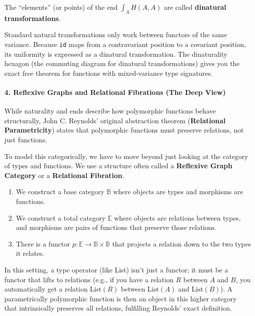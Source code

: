 \documentclass[
]{article}
\providecommand{\tightlist}{%
  \setlength{\itemsep}{0pt}\setlength{\parskip}{0pt}}
\begin{document}
The ``elements'' (or points) of the end \(\int_A H(A, A)\) are called
\textbf{dinatural transformations}.

Standard natural transformations only work between functors of the same
variance. Because \texttt{id} maps from a contravariant position to a
covariant position, its uniformity is expressed as a dinatural
transformation. The dinaturality hexagon (the commuting diagram for
dinatural transformations) gives you the exact free theorem for
functions with mixed-variance type signatures.

\paragraph{4. Reflexive Graphs and Relational Fibrations (The Deep
View)}\label{reflexive-graphs-and-relational-fibrations-the-deep-view}

While naturality and ends describe how polymorphic functions behave
structurally, John C. Reynolds' original abstraction theorem
(\textbf{Relational Parametricity}) states that polymorphic functions
must preserve relations, not just functions.

To model this categorically, we have to move beyond just looking at the
category of types and functions. We use a structure often called a
\textbf{Reflexive Graph Category} or a \textbf{Relational Fibration}.

\begin{enumerate}
\def\labelenumi{\arabic{enumi}.}
\tightlist
\item
  We construct a base category \(\mathbb{B}\) where objects are types
  and morphisms are functions.
\item
  We construct a total category \(\mathbb{E}\) where objects are
  relations between types, and morphisms are pairs of functions that
  preserve those relations.
\item
  There is a functor \(p : \mathbb{E} \to \mathbb{B} \times \mathbb{B}\)
  that projects a relation down to the two types it relates.
\end{enumerate}

In this setting, a type operator (like List) isn't just a functor; it
must be a functor that lifts to relations (e.g., if you have a relation
\(R\) between \(A\) and \(B\), you automatically get a relation
\(\text{List}(R)\) between \(\text{List}(A)\) and \(\text{List}(B)\)). A
parametrically polymorphic function is then an object in this higher
category that intrinsically preserves all relations, fulfilling
Reynolds' exact definition.
\end{document}
